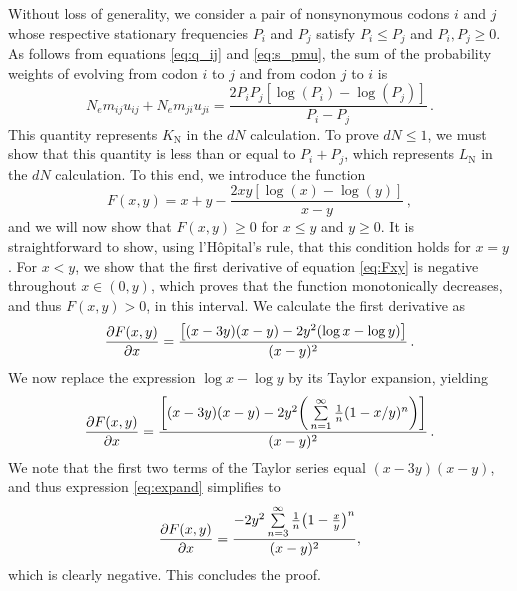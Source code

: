 \documentclass[11pt]{article}
\begin{document}
Without loss of generality, we consider a pair of nonsynonymous codons $i$ and $j$ whose respective stationary frequencies $P_i$ and $P_j$ satisfy $P_i \leq P_j$ and $P_i, P_j \geq 0$. As follows from equations \eqref{eq:q_ij} and \eqref{eq:s_pmu}, the sum of the probability weights of evolving from codon $i$ to $j$ and from codon $j$ to $i$ is
\begin{equation}
N_em_{ij} u_{ij} + N_em_{ji} u_{ji}  = \frac{2P_iP_j[\log(P_i) - \log(P_j)]}{P_i - P_j} \,.
\end{equation}
This quantity represents $K_\text{N}$ in the $dN$ calculation. To prove $dN \leq 1$, we must show that this quantity is less than or equal to $P_i + P_j$, which represents $L_\text{N}$ in the $dN$ calculation. To this end, we introduce the function 
\begin{equation}\label{eq:Fxy}
F(x,y) = x + y - \frac{2xy[\log(x) - \log(y)]}{x - y} \,,
\end{equation}
and we will now show that $F(x,y) \geq 0$ for $x \leq y$ and $y \geq 0 $. It is straightforward to show, using l'H\^{o}pital's rule, that this condition holds for $x=y$. For $x < y$, we show that the first derivative of equation \eqref{eq:Fxy} is negative throughout $x \in (0,y)$, which proves that the function monotonically decreases, and thus $F(x,y) > 0$, in this interval. We calculate the first derivative as 
\begin{equation}
\frac{\partial{F(x,y)}}{\partial{x}} = \frac{\big{[} (x-3y)(x-y) - 2y^2(\log{x} - \log{y}) \big{]}}{(x-y)^2} \,.
\end{equation}
We now replace the expression $\log{x} - \log{y}$ by its Taylor expansion, yielding
\begin{equation}\label{eq:expand}
	\frac{\partial{F(x,y)}}{\partial{x}} = 
	\frac{ \bigg{[} (x-3y)(x-y) - 2y^2\bigg{(}\sum\limits_{n=1}^\infty \frac{1}{n} (1-x/y)^n\bigg{)} \bigg{]}}{(x-y)^2} \,.
\end{equation} We note that the first two terms of the Taylor series equal $(x-3y)(x-y)$, and thus expression \eqref{eq:expand} simplifies to 
\begin{equation}
\frac{\partial{F(x,y)}}{\partial{x}} = \frac{-2y^2\sum\limits_{n=3}^\infty \frac{1}{n} \big{(}1-\frac{x}{y}\big{)}^n}{(x-y)^2} ,
\end{equation}
which is clearly negative. This concludes the proof.


\bigskip
\end{document}
